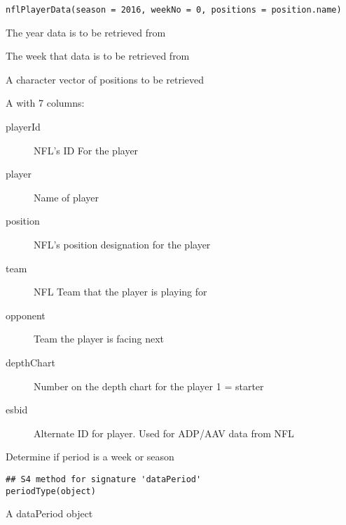 \documentclass[a4paper]{book}
\begin{document}
%
\begin{Usage}
\begin{verbatim}
nflPlayerData(season = 2016, weekNo = 0, positions = position.name)
\end{verbatim}
\end{Usage}
%
\begin{Arguments}
\begin{ldescription}
\item[\code{season}] The year data is to be retrieved from

\item[\code{weekNo}] The week that data is to be retrieved from

\item[\code{positions}] A character vector of positions to be retrieved
\end{ldescription}
\end{Arguments}
%
\begin{Value}
A  with 7 columns:
\begin{description}

\item[playerId] NFL's ID For the player
\item[player] Name of player
\item[position] NFL's position designation for the player
\item[team] NFL Team that the player is playing for
\item[opponent] Team the player is facing next
\item[depthChart] Number on the depth chart for the player 1 = starter
\item[esbid] Alternate ID for player. Used for ADP/AAV data from NFL

\end{description}

\end{Value}
%
\begin{Description}\relax
Determine if period is a week or season
\end{Description}
%
\begin{Usage}
\begin{verbatim}
## S4 method for signature 'dataPeriod'
periodType(object)
\end{verbatim}
\end{Usage}
%
\begin{Arguments}
\begin{ldescription}
\item[\code{x}] A dataPeriod object
\end{ldescription}
\end{Arguments}
\end{document}
